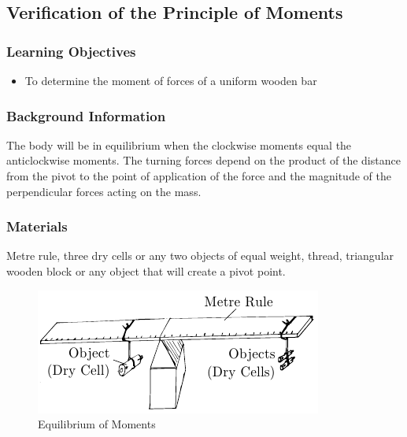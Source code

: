\subsection{Verification of the Principle of Moments}

\subsubsection*{Learning Objectives}
\begin{itemize}
\item{To determine the moment of forces of a uniform wooden bar}
\end{itemize}

\subsubsection*{Background Information}
The body will be in equilibrium when the clockwise moments equal the anticlockwise moments. The turning forces depend on the product of the distance from the pivot to the point of application of the force and the magnitude of the perpendicular forces acting on the mass.  

\subsubsection*{Materials}
Metre rule, three dry cells or any two objects of equal weight, thread, triangular wooden block or any object that will create a pivot point.  

\begin{figure}[h]
\begin{center}
\includegraphics{./img/equilibrium-moment.png}
\caption{Equilibrium of Moments}
\label{fig:equilibrium-moment}
\end{center}
\end{figure}

